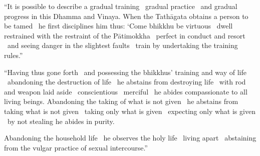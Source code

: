 \begin{justify}
“It is possible to describe a gradual training \breathmark\ gradual practice \breathmark\ and gradual progress in this Dhamma and Vinaya. When the Tathāgata obtains a person to be tamed \breathmark\ he first disciplines him thus: ‘Come bhikkhu be virtuous \breathmark\ dwell restrained with the restraint of the Pātimokkha \breathmark\ perfect in conduct and resort \breathmark\ and seeing danger in the slightest faults \breathmark\ train by undertaking the training rules.”
\end{justify}

\suttaRef{[MN 107]}

\begin{justify}
“Having thus gone forth \breathmark\ and possessing the bhikkhus’ training and way of life \breathmark\ abandoning the destruction of life \breathmark\ he abstains from destroying life \breathmark\ with rod and weapon laid aside \breathmark\ conscientious \breathmark\ merciful \breathmark\ he abides compassionate to all living beings. Abandoning the taking of what is not given \breathmark\ he abstains from taking what is not given \breathmark\ taking only what is given \breathmark\ expecting only what is given \breathmark\ by not stealing he abides in purity.
\end{justify}

\begin{justify}
Abandoning the household life \breathmark\ he observes the holy life \breathmark\ living apart \breathmark\ abstaining from the vulgar practice of sexual intercourse.”
\end{justify}


